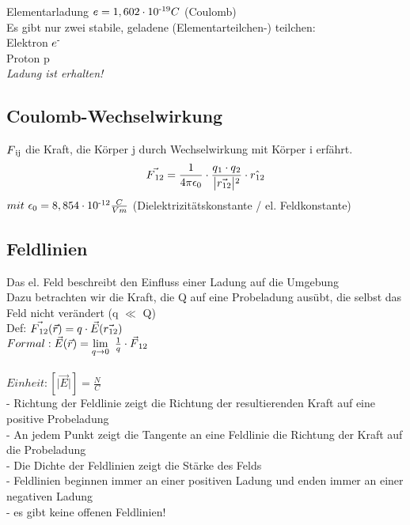 \documentclass[a4paper,12pt]{report}
\begin{document}
Elementarladung 		$ e = 1,602\cdot10\textsuperscript{-19} C $ (Coulomb) \\		

Es gibt nur zwei stabile, geladene (Elementarteilchen-) teilchen:\\
	Elektron		$ e\textsuperscript{-} $\\
	Proton		p\\


\emph{Ladung ist erhalten!}\\

\subsection{Coulomb-Wechselwirkung}
$ F\textsubscript{ij} $ die Kraft, die Körper j durch Wechselwirkung mit Körper i erfährt.\\
\begin{equation}
\vec{F \textsubscript{12}} = \frac{1}{4 \pi \epsilon \textsubscript{0}} \cdot \frac{q\textsubscript{1} \cdot  q\textsubscript{2}}{\bigl | \vec{r\textsubscript{12}}\bigl| \textsuperscript{2}} \cdot \hat{r\textsubscript{12}}
\end{equation}
$ mit 	\ \epsilon\textsubscript{0} = 8,854 \cdot 10\textsuperscript{-12} \frac{C}{Vm} $ (Dielektrizitätskonstante / el. Feldkonstante) 

\subsection{Feldlinien}
Das el. Feld beschreibt den Einfluss einer Ladung auf die Umgebung\\
Dazu betrachten wir die Kraft, die Q auf eine Probeladung ausübt, die selbst das Feld nicht verändert (q $ \ll $ Q)\\

Def: $ \vec{F\textsubscript{12}}(\vec{r}) = q \cdot \vec{E}(\vec{r\textsubscript{12}}) $ \\
	$		 Formal: \vec{E}(\vec{r}) = \lim \limits_{q \to 0}\  \frac{1}{q} \cdot \vec{F}\textsubscript{12} $\\
\\
$ Einheit: [\bigl |\vec{E} \bigl|] = \frac{N}{C} $\\

- Richtung der Feldlinie zeigt die Richtung der resultierenden Kraft auf eine positive Probeladung\\
- An jedem Punkt zeigt die Tangente an eine Feldlinie die Richtung der Kraft auf die Probeladung\\
- Die Dichte der Feldlinien zeigt die Stärke des Felds\\
- Feldlinien beginnen immer an einer positiven Ladung und enden immer an einer negativen Ladung\\
- es gibt keine offenen Feldlinien!\\
\end{document}

